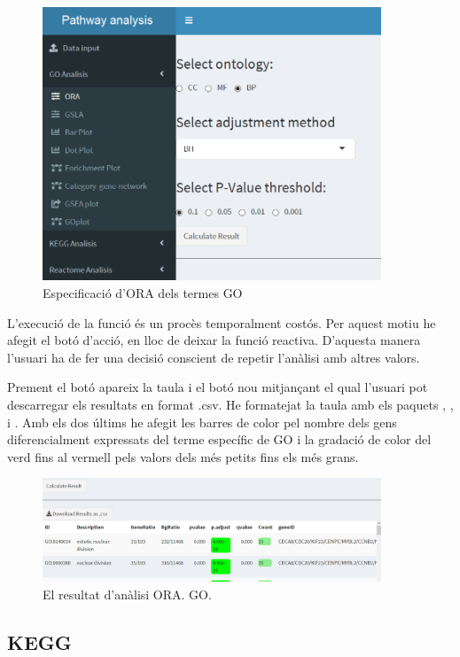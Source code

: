 \begin{figure}[h!]
\includegraphics[width=0.9\textwidth]{App_F5_Items_GO_ORA.png}
\caption{Especificació d'ORA dels termes GO}
\end{figure}
L'execució de la funció és un procès temporalment costós. Per aquest motiu he afegit el botó d'acció, en lloc de deixar la funció reactiva. D'aquesta manera l'usuari ha de fer una decisió conscient de repetir l'anàlisi amb altres valors.

Prement el botó apareix la taula i el botó nou mitjançant el qual l'usuari pot descarregar els resultats en format .csv. He formatejat la taula amb els paquets , ,  i . Amb els dos últims he afegit les barres de color pel nombre dels gens diferencialment expressats del terme específic de GO i la gradació de color del verd fins al vermell pels valors dels més petits fins els més grans. 

\begin{figure}[h!]
\centering
\includegraphics[width=0.9\textwidth]{App_F6_Items_GO_ORA_Table.png} 
\caption{El resultat d'anàlisi ORA. GO.}
\end{figure}


\subsection{KEGG}

